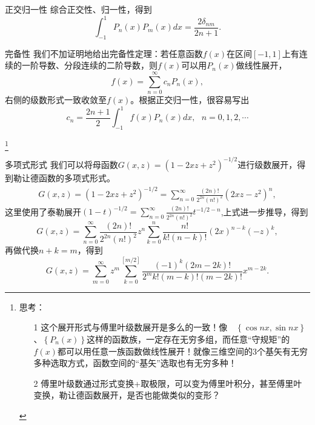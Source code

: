 \documentclass[11pt]{beamer}
\begin{document}
\begin{frame}{正交归一性}
综合正交性、归一性，得到
\begin{equation}
\int^1_{-1} P_n(x) P_m(x) dx =  \frac{2\delta_{nm}}{2n+1}.
\end{equation}
\end{frame}

\begin{frame}{完备性}
我们不加证明地给出完备性定理：若任意函数$f(x)$在区间$[-1,1]$上有连续的一阶导数、分段连续的二阶导数，则$f(x)$可以用$P_n(x)$做线性展开，
\begin{equation}
f(x) = \sum^\infty_{n=0} c_n P_n(x),
\end{equation}
右侧的级数形式一致收敛至$f(x)$。根据正交归一性，很容易写出
\begin{equation}
c_n = \frac{2n+1}{2} \int^1_{-1} f(x) P_n(x) dx, ~~~ n=0,1,2,\cdots
\end{equation}

\footnote{
思考：
\begin{itemize}
\item [1] 这个展开形式与傅里叶级数展开是多么的一致！像　$\left\{\cos nx, \sin nx \right\}$、$\left\{P_n(x)\right\}$这样的函数族，一定存在无穷多组，而任意“守规矩”的$f(x)$都可以用任意一族函数做线性展开！就像三维空间的3个基矢有无穷多种选取方式，函数空间的“基矢”选取也有无穷多种！
\item [2] 傅里叶级数通过形式变换+取极限，可以变为傅里叶积分，甚至傅里叶变换，勒让德函数展开，是否也能做类似的变形？
\end{itemize}
}

\end{frame}

\begin{frame}{多项式形式}
我们可以将母函数$G(x,z) = (1-2xz+z^2)^{-1/2}$进行级数展开，得到勒让德函数的多项式形式。
\begin{eqnarray}
G(x,z) = (1-2xz+z^2)^{-1/2} = \sum^\infty_{n=0} \frac{(2n)!}{2^{2n} (n!)^2} (2xz-z^2)^n,
\end{eqnarray}
这里使用了泰勒展开$(1-t)^{-1/2} = \sum^\infty_{n=0} \frac{(2n)!}{2^{2n} (n!)^2} t^{-1/2-n}$,上式进一步推导，得到
\begin{equation}
G(x,z) = \sum^\infty_{n=0} \frac{(2n)!}{2^{2n}(n!)^2} z^n \sum^n_{k=0} \frac{n!}{k! (n-k)!}(2x)^{n-k} (-z)^k,
\end{equation}
再做代换$n+k = m$，得到
\begin{equation}
G(x,z) = \sum^\infty_{m=0}　z^m \sum^{[m/2]}_{k=0} \frac{(-1)^k (2m-2k)!}{2^m k! (m-k)! (m-2k)!} x^{m-2k}.
\end{equation}

\end{frame}
\end{document}
